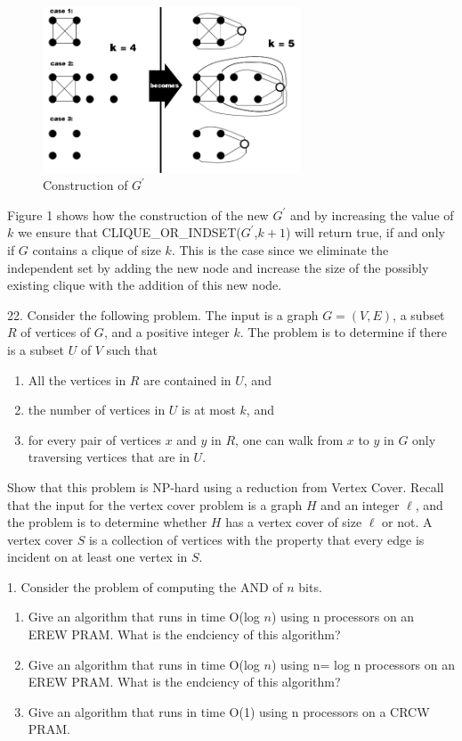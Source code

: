 \documentclass[10pt]{article}
\begin{document}
		\begin{figure}[h]
		\centering
		\includegraphics[width=290px]{cliqueoris.png}
		\caption{Construction of $G^\prime$}
		\end{figure}
		
	Figure 1 shows how the construction of the new $G^\prime$ and by increasing the value of $k$ we ensure that
	CLIQUE\_OR\_INDSET($G^\prime$,$k + 1$) will return true, if and only if $G$ contains a clique of size $k$. 
	This is the case since we eliminate the independent set by adding the new node and increase the size of the 
	possibly existing clique with the addition of this new node.
	
	\newpage


	22. Consider the following problem. The input is a graph $G = (V, E)$, a subset $R$ of vertices of $G$, and a
	positive integer $k$. The problem is to determine if there is a subset $U$ of $V$ such that
	\begin{enumerate}
		\item All the vertices in $R$ are contained in $U$, and
		\item the number of vertices in $U$ is at most $k$, and
		\item for every pair of vertices $x$ and $y$ in $R$, one can walk from $x$ to $y$ in $G$ only traversing vertices that
		are in $U$.
	\end{enumerate}
	Show that this problem is NP-hard using a reduction from Vertex Cover. Recall that the input for the
	vertex cover problem is a graph $H$ and an integer $\ell$, and the problem is to determine whether $H$ has a
	vertex cover of size $\ell$ or not. A vertex cover $S$ is a collection of vertices with the property that every
	edge is incident on at least one vertex in $S$.

	\newpage

	1. Consider the problem of computing the AND of $n$ bits.
	\begin{enumerate}
		\item Give an algorithm that runs in time O(log $n$) using n processors on an EREW PRAM. What is
		the endciency of this algorithm?
		\item Give an algorithm that runs in time O(log $n$) using n= log n processors on an EREW PRAM.
		What is the endciency of this algorithm?
		\item Give an algorithm that runs in time O(1) using n processors on a CRCW PRAM.
	\end{enumerate}
\end{document}
